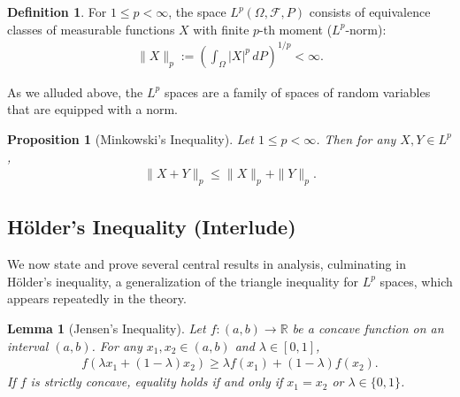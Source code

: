 \documentclass[11pt,reqno]{amsart}
\newtheorem{lemma}[theorem]{Lemma}
\newtheorem{proposition}[theorem]{Proposition}
\theoremstyle{definition}
\newtheorem{definition}[theorem]{Definition}
\theoremstyle{remark}
\begin{document}
\begin{definition}
	For $1 \leq p < \infty$, the space $L^p(\Omega, \mathcal{F}, P)$ consists of equivalence classes of measurable functions $X$ with finite $p$-th moment (\(L^p\)-norm):
	\begin{align*}
		\|X\|_p := \left( \int_\Omega |X|^p \, dP \right)^{1/p} < \infty.
	\end{align*}
\end{definition}

As we alluded above, the \(L^p\) spaces are a family of spaces of random variables that are equipped with a norm.

\begin{proposition}[Minkowski's Inequality]
	Let $1 \leq p < \infty$. Then for any $X, Y \in L^p$,
	\begin{align*}
		\|X + Y\|_p \leq \|X\|_p + \|Y\|_p.
	\end{align*}
\end{proposition}

\subsection{Hölder's Inequality (Interlude)}

We now state and prove several central results in analysis, culminating in Hölder's inequality, a generalization of the triangle inequality for \(L^p\) spaces, which appears repeatedly in the theory.

\begin{lemma}[Jensen's Inequality]
	Let $f: (a,b) \to \mathbb{R}$ be a concave function on an interval $(a,b)$. For any $x_1, x_2 \in (a,b)$ and $\lambda \in [0,1]$,
	\begin{align*}
		f(\lambda x_1 + (1-\lambda) x_2) \geq \lambda f(x_1) + (1-\lambda) f(x_2).
	\end{align*}
	If $f$ is strictly concave, equality holds if and only if $x_1 = x_2$ or $\lambda \in \{0,1\}$.
\end{lemma}
\end{document}
